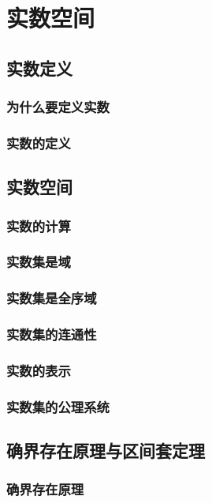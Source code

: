 

\chapter{实数空间}\label{ch:9}
\section{实数定义}
\subsection{为什么要定义实数}
\subsection{实数的定义}
\section{实数空间}
\subsection{实数的计算}
\subsection{实数集是域}
\subsection{实数集是全序域}
\subsection{实数集的连通性}
\subsection{实数的表示}
\subsection{实数集的公理系统}
\begin{exercise}

\end{exercise}
\section{确界存在原理与区间套定理}
\subsection{确界存在原理}
